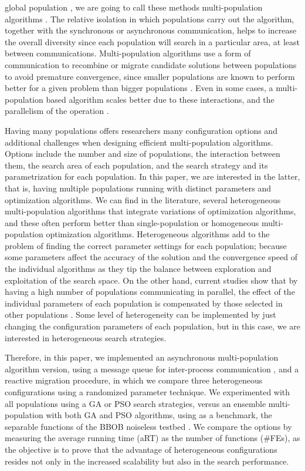 global population \cite{li2015multi}, we are going to call these methods 
multi-population algorithms \cite{Ma2019}. The relative 
isolation in which populations carry out the algorithm, together with the
synchronous or asynchronous communication, helps to increase the overall
diversity since each population will search in a particular area, at least
between communications. Multi-population algorithms use a form of
communication to recombine or migrate candidate solutions between populations
to avoid premature convergence, since smaller populations are known to perform
better for a given problem than bigger populations
\cite{li2016multi,wu2016differential}. Even in some cases, a multi-population based
algorithm scales better due to these interactions, and the parallelism of the
operation \cite{ALBA20027}. 

Having many populations offers researchers many configuration options and
additional challenges when designing efficient multi-population algorithms.
Options include the number and size of populations, the interaction between
them, the search area of each population, and the search strategy and its
parametrization for each population.  In this paper, we are interested in the
latter, that is, having multiple populations running with distinct parameters
and optimization algorithms. We can find in the literature, several
heterogeneous multi-population algorithms that integrate variations of optimization
algorithms, and these often perform better than single-population or homogeneous
multi-population optimization algorithms\cite{wu2016differential,nseef2016adaptive}.
Heterogeneous algorithms add to
the problem of finding the correct parameter settings for each population;
because some parameters affect the accuracy of the solution and the convergence
speed of the individual algorithms as they tip the balance between exploration
and exploitation of the search space. On the other hand, current studies show
that by having a high number of populations communicating in parallel, the
effect of the individual parameters of each population is compensated by those
selected in other populations \cite{li2016multi,tanabe2013evaluation}. Some
level of heterogeneity can be implemented by just changing the configuration
parameters of each population, but in this case, we are interested in
heterogeneous search strategies.

Therefore, in this paper, we implemented an asynchronous multi-population
algorithm version, using a message queue for inter-process communication \cite{
guervos2018introducing}, and a reactive migration procedure, in which we compare
three heterogeneous configurations using a randomized parameter technique. We
experimented with all populations using a GA or PSO search strategies, versus an
ensemble multi-population with both GA and PSO algorithms, using as a benchmark,
the separable functions of the BBOB noiseless testbed \cite{hansen2009real}. 
We compare the options by
measuring the average running time (aRT) as the number of functions (\#FEs), as
the objective is to prove that the advantage of heterogeneous configurations
resides not only in the increased scalability but also in the search
performance. 

